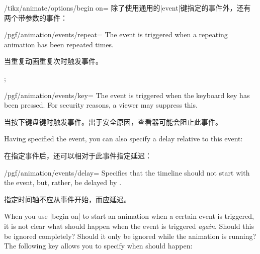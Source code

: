 \begin{key}{/tikz/animate/options/begin on=}
    除了使用通用的|event|键指定的事件外，还有两个带参数的事件：
    \begin{key}{/pgf/animation/events/repeat=}
        The event is triggered when a repeating animation has been repeated
         times.
        
        当重复动画重复次时触发事件。
\begin{codeexample}[
    preamble={\usetikzlibrary{animations}},
    animation list={
        0.333/\frac{1}{3},0.666/\frac{2}{3},1,
        1.333/1\frac{1}{3},1.666/1\frac{2}{3},2,
        2.333/2\frac{1}{3},2.666/2\frac{2}{3},3,
        3.333/2\frac{1}{3},3.666/2\frac{2}{3},4%
    },
]
\tikz
  ;
\end{codeexample}
    \end{key}

    \begin{key}{/pgf/animation/events/key=}
        The event is triggered when the keyboard key  has been
        pressed. For security reasons, a viewer may suppress this.

        当按下键盘键时触发事件。出于安全原因，查看器可能会阻止此事件。
    \end{key}

    Having specified the event, you can also specify a delay relative to this
    event:

    在指定事件后，还可以相对于此事件指定延迟：

    \begin{key}{/pgf/animation/events/delay=}
        Specifies that the timeline should not start with the event, but,
        rather, be delayed by .

        指定时间轴不应从事件开始，而应延迟。
    \end{key}
\end{key}

When you use |begin on| to start an animation when a certain event is
triggered, it is not clear what should happen when the event is triggered
\emph{again}. Should this be ignored completely? Should it only be ignored
while the animation is running? The following key allows you to specify when
should happen:

